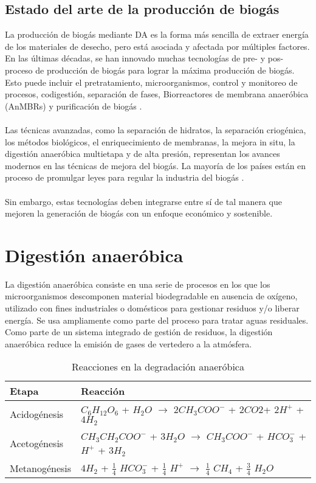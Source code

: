 \documentclass[a4paper,11pt]{article}
\begin{document}
\subsection{Estado del arte de la producción de biogás}
La producción de biogás mediante DA es la forma más sencilla de extraer energía de los materiales de desecho, pero está asociada y afectada por múltiples factores. En las últimas décadas, se han innovado muchas tecnologías de pre- y pos- proceso de producción de biogás para lograr la máxima producción de biogás. Esto puede incluir el pretratamiento, microorganismos, control y monitoreo de procesos, codigestión, separación de fases, Biorreactores de membrana anaeróbica (AnMBRs) y purificación de biogás \cite{Maurya2019}.
\\\\
Las técnicas avanzadas, como la separación de hidratos, la separación criogénica, los métodos biológicos, el enriquecimiento de membranas, la mejora in situ, la digestión anaeróbica multietapa y de alta presión, representan los avances modernos en las técnicas de mejora del biogás. La mayoría de los países están en proceso de promulgar leyes para regular la industria del biogás \cite{Korbag2020}.
\\\\
Sin embargo, estas tecnologías deben integrarse entre sí de tal manera que mejoren la generación de biogás con un enfoque económico y sostenible. 

\section{Digestión anaeróbica}
La digestión anaeróbica consiste en una serie de procesos en los que los microorganismos descomponen material biodegradable en ausencia de oxígeno, utilizado con fines industriales o domésticos para gestionar residuos y/o liberar energía. Se usa ampliamente como parte del proceso para tratar aguas residuales. Como parte de un sistema integrado de gestión de residuos, la digestión anaeróbica reduce la emisión de gases de vertedero a la atmósfera. 

\begin{table}[h]
\centering
\begin{tabular}{|p{6cm}|p{6cm}|}
\hline
{\bf Etapa} & {\bf Reacción} \\
\hline
Acidogénesis & $C_{6}H_{12}O_{6}$ + $H_{2}O$ $\longrightarrow$ $2CH_{3}COO^-$ + $2CO2$+ $2H^+$ + $4H_{2}$ \\
\hline
Acetogénesis & $CH_{3}CH_{2}COO^-$  + $3H_{2}O$ $\longrightarrow$ $CH_{3}COO^-$ + $HCO_{3}^-$ + $H^+$ + $3H_{2}$ \\
\hline
Metanogénesis &  $4H_{2}$ + $\frac{1}{4}$ $HCO_{3}^-$ + $\frac{1}{4}$ $H^+$ $\longrightarrow$ $\frac{1}{4}$ $CH_{4}$ + $\frac{3}{4}$ $H_{2}O$ \\
\hline
\end{tabular}
\caption{Reacciones en la degradación anaeróbica \cite{Moraes2015}}
\end{table}
\end{document}
